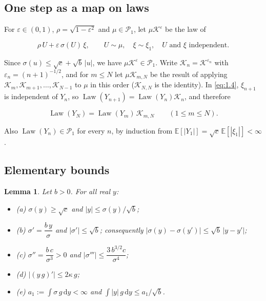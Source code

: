\documentclass[aip,jmp,preprint,onecolumn,floatfix,superscriptaddress,nofootinbib,11pt]{revtex4-2}
\theoremstyle{plain}
\newtheorem{lemma}{Lemma}
\theoremstyle{remark}
\numberwithin{equation}{section}
\newcommand{\dd}{\mathrm{d}}
\newcommand{\E}{\mathbb{E}}
\newcommand{\eps}{\varepsilon}
\newcommand{\Law}{\operatorname{Law}}
\begin{document}
\subsection{One step as a map on laws}\label{sec:4_2}

For $\eps\in(0,1)$, $\rho=\sqrt{1-\eps^{2}}$ and $\mu\in\mathcal P_1$, let $\mu \mathcal K^{\eps}$ be the law of

\begin{equation}
\rho\,U+\eps\,\sigma(U)\,\xi,\qquad U\sim\mu,\quad \xi\sim\xi_1,\quad U\text{ and }\xi\text{ independent}.
\label{eq:4.2}
\end{equation}

Since $\sigma(u)\le\sqrt c+\sqrt b\,|u|$, we have $\mu \mathcal K^{\eps}\in\mathcal P_1$. Write $\mathcal K_n=\mathcal K^{\eps_n}$ with $\eps_n=(n+1)^{-1/2}$, and for $m\le N$ let $\mu \mathcal K_{m,N}$ be the result of applying $\mathcal K_m,\mathcal K_{m+1},\dots,\mathcal K_{N-1}$ to $\mu$ in this order ($\mathcal K_{N,N}$ is the identity). In \eqref{eq:1.4}, $\xi_{n+1}$ is independent of $Y_n$, so $\Law(Y_{n+1})=\Law(Y_n)\mathcal K_n$, and therefore

\begin{equation}
\Law(Y_N)=\Law(Y_m)\,\mathcal K_{m,N}\qquad(1\le m\le N).
\label{eq:4.3}
\end{equation}

Also $\Law(Y_n)\in\mathcal P_1$ for every $n$, by induction from $\E[|Y_1|]=\sqrt c\,\E[|\xi_1|]<\infty$.

\subsection{Elementary bounds}\label{sec:4_3}

\begin{lemma}

Let $b>0$. For all real $y$:

\begin{itemize}
\item (a) $\sigma(y)\ge\sqrt c$ and $|y|\le\sigma(y)/\sqrt b$;
\item (b) $\sigma'=\dfrac{b\,y}{\sigma}$ and $|\sigma'|\le\sqrt b$; consequently $|\sigma(y)-\sigma(y')|\le\sqrt b\,|y-y'|$;
\item (c) $\sigma''=\dfrac{b\,c}{\sigma^{3}}>0$ and $|\sigma'''|\le\dfrac{3\,b^{3/2}c}{\sigma^{4}}$;
\item (d) $\big|(y\,g)'\big|\le2\kappa\,g$;
\item (e) $a_1:=\displaystyle\int\sigma\,g\,\dd y<\infty$ and $\displaystyle\int|y|\,g\,\dd y\le a_1/\sqrt b$.
\end{itemize}

\end{lemma}
\end{document}
